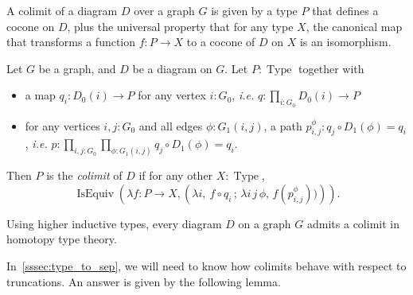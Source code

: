 \documentclass[notfinal]{jfrarticle}
\DeclareMathOperator{\Type}{Type}
\DeclareMathOperator{\IsEquiv}{IsEquiv}
\newcommand{\ie}{\emph{i.e.}}
\begin{document}


A colimit of a diagram $D$ over a graph $G$ is given by a type $P$
that defines a cocone on $D$, plus the universal property that for any
type $X$, the canonical map that transforms a function $f : P
\rightarrow X$ to a cocone of $D$ on $X$ is an isomorphism.
% 
\begin{defi}\label{def:colimit}
Let $G$ be a graph, and $D$ be a diagram on $G$. 
Let $P:\Type$ together with
\begin{itemize}
\item a map $q_i : D_0(i) \to P$ for any
vertex $i:G_0$, \ie{} $q : \prod_{i:G_0} D_0(i) \to P$
\item for any vertices $i,j:G_0$ and all edges $\phi:G_1(i,j)$, a path
  $p_{i,j}^\phi : q_j \circ D_1(\phi) = q_i$, \ie{}
  $p : \prod_{i,j:G_0} \prod_{\phi:G_1(i,j)} q_j \circ D_1(\phi) = q_i.$
\end{itemize}

Then $P$ is the {\em colimit} of $D$ if for any other $X:\Type$, 
\[
\IsEquiv\left(\lambda f:P \to X, \left( \lambda i,~f \circ q_i\, ;\, \lambda i\, j\,
  \phi,\, f (p_{i, j}^\phi)) \right)\right).
\]
\end{defi}
Using higher inductive types, every diagram $D$ on a graph $G$ admits a
colimit in homotopy type theory. 

In~\ref{sssec:type_to_sep}, we will need to know how colimits
behave with respect to truncations. An answer is given by the
following lemma. 
\end{document}
